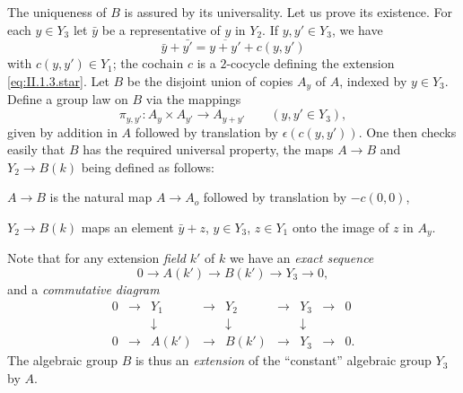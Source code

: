 The uniqueness of $B$ is assured by its universality.  Let us prove its
existence.  For each $y \in Y_3$ let $\bar{y}$ be a representative of $y$
in $Y_2$.  If $y, y' \in Y_3$, we have
\[
\bar{y} + \bar{y'} = \overline{y + y'} + c(y, y')
\]
with $c(y, y') \in Y_1$; the cochain $c$ is a $2$-cocycle defining the
extension \eqref{eq:II.1.3.star}.  Let $B$ be the disjoint union of copies
$A_y$ of $A$, indexed by $y \in Y_3$.  Define a group law on $B$ via the
mappings
\[
\pi_{y,y'} : A_y \times A_{y'} \longrightarrow A_{y+y'}
\qquad (y, y' \in Y_3),
\]
given by addition in $A$ followed by translation by $\epsilon(c(y,y'))$.
One then checks easily that $B$ has the required universal property, the
maps $A \to B$ and $Y_2 \to B(k)$ being defined as follows:

$A \to B$ is the natural map $A \to A_o$ followed by translation by
$-c(0, 0)$,

$Y_2 \to B(k)$ maps an element $\bar{y} + z$, $y \in Y_3$, $z \in Y_1$
onto the image of $z$ in $A_y$.

Note that for any extension \emph{field} $k'$ of $k$ we have an
\emph{exact sequence}
\[
0 \longrightarrow A(k') \longrightarrow B(k') \longrightarrow Y_3
\longrightarrow 0,
\]
and a \emph{commutative diagram}
\[
\begin{array}{ccccccccc}
0 & \to & Y_1 & \to & Y_2 & \to & Y_3 & \to & 0 \\
  &     & \downarrow & & \downarrow & & \downarrow & & \\
0 & \to & A(k') & \to & B(k') & \to & Y_3 & \to & 0.
\end{array}
\]
The algebraic group $B$ is thus an \emph{extension} of the ``constant''
algebraic group $Y_3$ by $A$.


